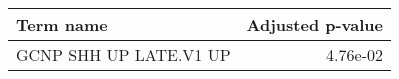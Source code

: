 \begin{tabular}{lr}
\toprule
             Term name &  Adjusted p-value \\
\midrule
GCNP SHH UP LATE.V1 UP &          4.76e-02 \\
\bottomrule
\end{tabular}
